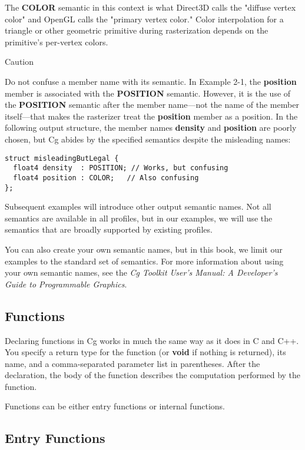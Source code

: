 \documentclass[../main.tex]{subfiles}
\begin{document}
The \textbf{COLOR} semantic in this context is what Direct3D calls the "diffuse vertex color" and OpenGL calls the "primary vertex color." Color interpolation for a triangle or other geometric primitive during rasterization depends on the primitive's per-vertex colors.

\begin{framed}
Caution

Do not confuse a member name with its semantic. In Example 2-1, the \textbf{position} member is associated with the \textbf{POSITION} semantic. However, it is the use of the \textbf{POSITION} semantic after the member name—not the name of the member itself—that makes the rasterizer treat the \textbf{position} member as a position. In the following output structure, the member names \textbf{density} and \textbf{position} are poorly chosen, but Cg abides by the specified semantics despite the misleading names:

\FloatBarrier
\begin{lstlisting}
struct misleadingButLegal {
  float4 density  : POSITION; // Works, but confusing
  float4 position : COLOR;   // Also confusing
};
\end{lstlisting}
\FloatBarrier
\end{framed}

Subsequent examples will introduce other output semantic names. Not all semantics are available in all profiles, but in our examples, we will use the semantics that are broadly supported by existing profiles.

You can also create your own semantic names, but in this book, we limit our examples to the standard set of semantics. For more information about using your own semantic names, see the \textit{Cg Toolkit User's Manual: A Developer's Guide to Programmable Graphics}.

\subsection{Functions}

Declaring functions in Cg works in much the same way as it does in C and C++. You specify a return type for the function (or \textbf{void} if nothing is returned), its name, and a comma-separated parameter list in parentheses. After the declaration, the body of the function describes the computation performed by the function.

Functions can be either entry functions or internal functions.

\subsection*{Entry Functions}
\end{document}
